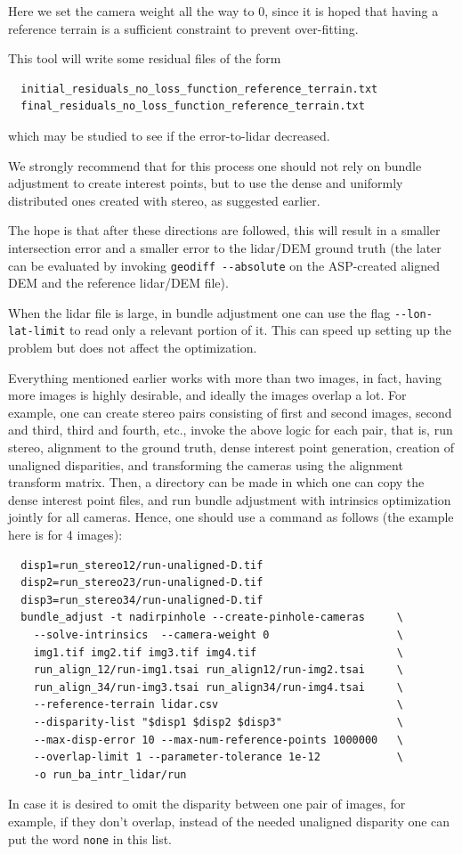 Here we set the camera weight all the way to 0, since it is hoped that having
a reference terrain is a sufficient constraint to prevent over-fitting.

This tool will write some residual files of the form 
\begin{verbatim}
  initial_residuals_no_loss_function_reference_terrain.txt
  final_residuals_no_loss_function_reference_terrain.txt
\end{verbatim}

which may be studied to see if the error-to-lidar decreased.

We strongly recommend that for this process one should not rely on bundle adjustment
to create interest points, but to use the dense and uniformly distributed ones 
created with stereo, as suggested earlier. 

The hope is that after these directions are followed, this will result in a smaller intersection
error and a smaller error to the lidar/DEM ground truth (the later can be evaluated by
invoking \texttt{geodiff -\/-absolute} on the ASP-created aligned DEM
and the reference lidar/DEM file).

When the lidar file is large, in bundle adjustment one can use the flag
\texttt{-\/-lon-lat-limit} to read only a relevant portion of it. This
can speed up setting up the problem but does not affect the
optimization.

Everything mentioned earlier works with more than two images, in fact,
having more images is highly desirable, and ideally the images overlap a
lot. For example, one can create stereo pairs consisting of first and
second images, second and third, third and fourth, etc., invoke the above logic for each
pair, that is, run stereo, alignment to the ground truth, dense interest
point generation, creation of unaligned disparities, and transforming the cameras using the alignment
transform matrix. Then, a directory can be made in which one can
copy the dense interest point files, and run bundle adjustment with intrinsics optimization
jointly for all cameras. Hence, one should use a command as follows
(the example here is for 4 images):

\begin{verbatim}
  disp1=run_stereo12/run-unaligned-D.tif
  disp2=run_stereo23/run-unaligned-D.tif
  disp3=run_stereo34/run-unaligned-D.tif
  bundle_adjust -t nadirpinhole --create-pinhole-cameras     \
    --solve-intrinsics  --camera-weight 0                    \
    img1.tif img2.tif img3.tif img4.tif                      \
    run_align_12/run-img1.tsai run_align12/run-img2.tsai     \
    run_align_34/run-img3.tsai run_align34/run-img4.tsai     \
    --reference-terrain lidar.csv                            \
    --disparity-list "$disp1 $disp2 $disp3"                  \
    --max-disp-error 10 --max-num-reference-points 1000000   \
    --overlap-limit 1 --parameter-tolerance 1e-12            \
    -o run_ba_intr_lidar/run
\end{verbatim}
In case it is desired to omit the disparity between one pair
of images, for example, if they don't overlap, instead of
the needed unaligned disparity one can put the word \texttt{none} in this list.

